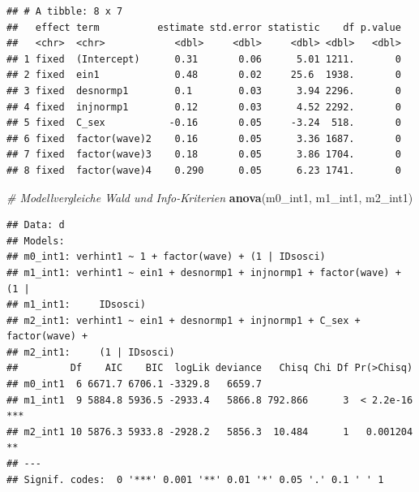 \documentclass[
]{book}
\newenvironment{Shaded}{\begin{snugshade}}{\end{snugshade}}
\newcommand{\CommentTok}[1]{\textcolor[rgb]{0.56,0.35,0.01}{\textit{#1}}}
\newcommand{\DataTypeTok}[1]{\textcolor[rgb]{0.13,0.29,0.53}{#1}}
\newcommand{\DecValTok}[1]{\textcolor[rgb]{0.00,0.00,0.81}{#1}}
\newcommand{\KeywordTok}[1]{\textcolor[rgb]{0.13,0.29,0.53}{\textbf{#1}}}
\newcommand{\NormalTok}[1]{#1}
\newcommand{\OperatorTok}[1]{\textcolor[rgb]{0.81,0.36,0.00}{\textbf{#1}}}
\newcommand{\StringTok}[1]{\textcolor[rgb]{0.31,0.60,0.02}{#1}}
\begin{document}
\begin{Shaded}
\end{Shaded}

\begin{verbatim}
## # A tibble: 8 x 7
##   effect term          estimate std.error statistic    df p.value
##   <chr>  <chr>            <dbl>     <dbl>     <dbl> <dbl>   <dbl>
## 1 fixed  (Intercept)      0.31       0.06      5.01 1211.       0
## 2 fixed  ein1             0.48       0.02     25.6  1938.       0
## 3 fixed  desnormp1        0.1        0.03      3.94 2296.       0
## 4 fixed  injnormp1        0.12       0.03      4.52 2292.       0
## 5 fixed  C_sex           -0.16       0.05     -3.24  518.       0
## 6 fixed  factor(wave)2    0.16       0.05      3.36 1687.       0
## 7 fixed  factor(wave)3    0.18       0.05      3.86 1704.       0
## 8 fixed  factor(wave)4    0.290      0.05      6.23 1741.       0
\end{verbatim}

\begin{Shaded}
\begin{Highlighting}[]
\CommentTok{# Modellvergleiche Wald und Info-Kriterien}
\KeywordTok{anova}\NormalTok{(m0_int1, m1_int1, m2_int1)}
\end{Highlighting}
\end{Shaded}

\begin{verbatim}
## Data: d
## Models:
## m0_int1: verhint1 ~ 1 + factor(wave) + (1 | IDsosci)
## m1_int1: verhint1 ~ ein1 + desnormp1 + injnormp1 + factor(wave) + (1 | 
## m1_int1:     IDsosci)
## m2_int1: verhint1 ~ ein1 + desnormp1 + injnormp1 + C_sex + factor(wave) + 
## m2_int1:     (1 | IDsosci)
##         Df    AIC    BIC  logLik deviance   Chisq Chi Df Pr(>Chisq)    
## m0_int1  6 6671.7 6706.1 -3329.8   6659.7                              
## m1_int1  9 5884.8 5936.5 -2933.4   5866.8 792.866      3  < 2.2e-16 ***
## m2_int1 10 5876.3 5933.8 -2928.2   5856.3  10.484      1   0.001204 ** 
## ---
## Signif. codes:  0 '***' 0.001 '**' 0.01 '*' 0.05 '.' 0.1 ' ' 1
\end{verbatim}
\end{document}
